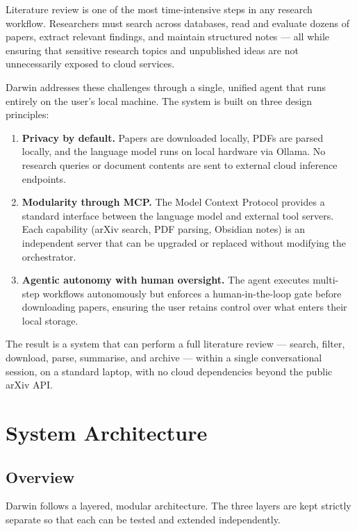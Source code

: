 \documentclass[12pt, a4paper]{article}
\begin{document}
Literature review is one of the most time-intensive steps in any research workflow. Researchers must search across databases, read and evaluate dozens of papers, extract relevant findings, and maintain structured notes --- all while ensuring that sensitive research topics and unpublished ideas are not unnecessarily exposed to cloud services.

Darwin addresses these challenges through a single, unified agent that runs entirely on the user's local machine. The system is built on three design principles:

\begin{enumerate}[leftmargin=2em, itemsep=4pt]
    \item \textbf{Privacy by default.} Papers are downloaded locally, PDFs are parsed locally, and the language model runs on local hardware via Ollama. No research queries or document contents are sent to external cloud inference endpoints.
    \item \textbf{Modularity through MCP.} The Model Context Protocol provides a standard interface between the language model and external tool servers. Each capability (arXiv search, PDF parsing, Obsidian notes) is an independent server that can be upgraded or replaced without modifying the orchestrator.
    \item \textbf{Agentic autonomy with human oversight.} The agent executes multi-step workflows autonomously but enforces a human-in-the-loop gate before downloading papers, ensuring the user retains control over what enters their local storage.
\end{enumerate}

The result is a system that can perform a full literature review --- search, filter, download, parse, summarise, and archive --- within a single conversational session, on a standard laptop, with no cloud dependencies beyond the public arXiv API.

\section{System Architecture}

\subsection{Overview}

Darwin follows a layered, modular architecture. The three layers are kept strictly separate so that each can be tested and extended independently.
\end{document}
